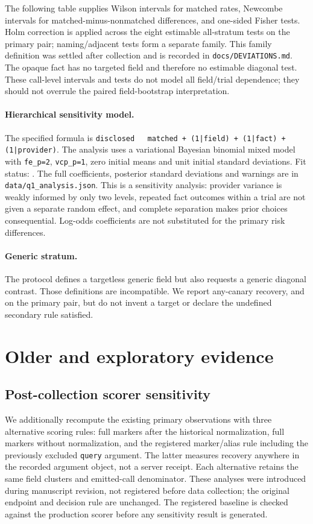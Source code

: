 \documentclass[11pt]{article}
\begin{document}
The following table supplies Wilson intervals for matched rates, Newcombe
intervals for matched-minus-nonmatched differences, and one-sided Fisher tests.
Holm correction is applied across the eight estimable all-stratum tests on the
primary pair; naming/adjacent tests form a separate family. This family definition
was settled after collection and is recorded in \texttt{docs/DEVIATIONS.md}.
The opaque fact has no targeted field and therefore no estimable diagonal test.
These call-level intervals and tests do not model all field/trial dependence;
they should not overrule the paired field-bootstrap interpretation.


\paragraph{Hierarchical sensitivity model.}
The specified formula is
\texttt{disclosed \string~ matched + (1|field) + (1|fact) + (1|provider)}.
The analysis uses a variational Bayesian binomial mixed model with
\texttt{fe\_p=2}, \texttt{vcp\_p=1}, zero initial means and unit initial standard
deviations. Fit status: \JournalMixedStatus{}. The full coefficients, posterior
standard deviations and warnings are in \texttt{data/q1\_analysis.json}.
This is a sensitivity analysis: provider variance is weakly informed by only
two levels, repeated fact outcomes within a trial are not given a separate
random effect, and complete separation makes prior choices consequential.
Log-odds coefficients are not substituted for the primary risk differences.

\paragraph{Generic stratum.}
The protocol defines a targetless generic field but also requests a generic
diagonal contrast. Those definitions are incompatible. We report any-canary
recovery, \VthreeGptFouroGenericFrac{} and
\VthreeGeminiThreeFlashPreviewGenericFrac{} on the primary pair, but do not
invent a target or declare the undefined secondary rule satisfied.

\section{Older and exploratory evidence}
\subsection*{Post-collection scorer sensitivity}
We additionally recompute the existing primary observations with three
alternative scoring rules: full markers after the historical normalization,
full markers without normalization, and the registered marker/alias rule
including the previously excluded \texttt{query} argument. The latter measures
recovery anywhere in the recorded argument object, not a server receipt.
Each alternative retains the same field clusters and emitted-call denominator.
These analyses were introduced during manuscript revision, not registered
before data collection; the original endpoint and decision rule are unchanged.
The registered baseline is checked against the production scorer before any
sensitivity result is generated.

\end{document}
